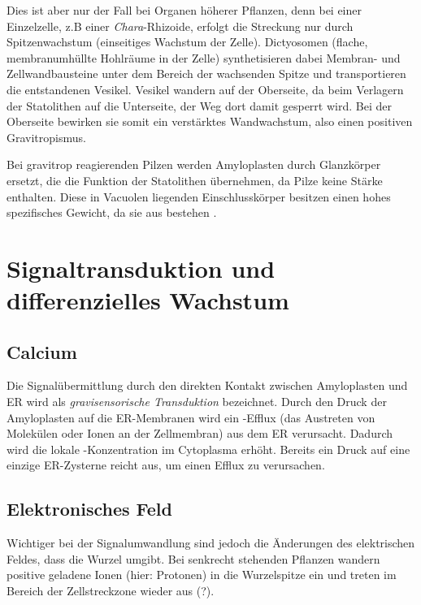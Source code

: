 \documentclass[
a4paper, 
11pt, 
ngerman,
listof=totoc,
bibliography=totocnumbered,
abstracton
]{scrreprt}
\begin{document}
Dies ist aber nur der Fall bei Organen höherer Pflanzen, denn bei einer Einzelzelle, z.B einer \emph{Chara}-Rhizoide, erfolgt die Streckung nur durch Spitzenwachstum (einseitiges Wachstum der Zelle).
Dictyosomen (flache, membranumhüllte Hohlräume in der Zelle) synthetisieren dabei Membran- und Zellwandbausteine unter dem Bereich der wachsenden Spitze und transportieren  die entstandenen Vesikel.
Vesikel wandern auf der Oberseite, da beim Verlagern der Statolithen auf die Unterseite, der Weg dort damit gesperrt wird. Bei der Oberseite bewirken sie somit ein verstärktes Wandwachstum, also einen positiven Gravitropismus.

Bei gravitrop reagierenden Pilzen werden Amyloplasten durch {\glqq Glanzkörper\grqq} ersetzt, die die Funktion der Statolithen übernehmen, da Pilze keine Stärke enthalten. Diese in Vacuolen liegenden Einschlusskörper besitzen einen hohes spezifisches Gewicht, da sie aus  bestehen \parencite[453f]{Strasburger}.




\section{Signaltransduktion und differenzielles Wachstum}

\subsection{Calcium}

Die Signalübermittlung durch den direkten Kontakt zwischen Amyloplasten und ER wird als \emph{gravisensorische Transduktion} bezeichnet.
Durch den Druck der Amyloplasten auf die ER-Membranen wird ein -Efflux (das Austreten von Molekülen oder Ionen an der Zellmembran) aus dem ER verursacht.
Dadurch wird die lokale -Konzentration im Cytoplasma erhöht. 
Bereits ein Druck auf eine einzige ER-Zysterne reicht aus, um einen Efflux zu verursachen.

\subsection{Elektronisches Feld}

Wichtiger bei der Signalumwandlung sind jedoch die Änderungen des elektrischen Feldes, dass die Wurzel umgibt.
Bei senkrecht stehenden Pflanzen wandern positive geladene Ionen (hier: Protonen) in die Wurzelspitze ein und treten im Bereich der Zellstreckzone wieder aus (?).
\end{document}
